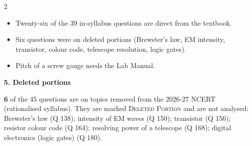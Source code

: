 \begin{multicols}{2}
{\begin{itemize}[leftmargin=1em,nosep]
\item Twenty-six of the 39 in-syllabus questions are direct from the textbook.
\item Six questions were on deleted portions (Brewster's law, EM intensity, transistor, colour code, telescope resolution, logic gates).
\item Pitch of a screw gauge needs the Lab Manual.
\end{itemize}}\par\medskip
\textbf{\color{crimson}5. Deleted portions}\par\smallskip
\textbf{6} of the 45 questions are on topics removed from the 2026-27 NCERT (rationalised syllabus). They are marked \textsc{Deleted Portion} and are not analysed: Brewster's law (Q 138); intensity of EM waves (Q 150); transistor (Q 156); resistor colour code (Q 164); resolving power of a telescope (Q 168); digital electronics (logic gates) (Q 180).\par
\end{multicols}


